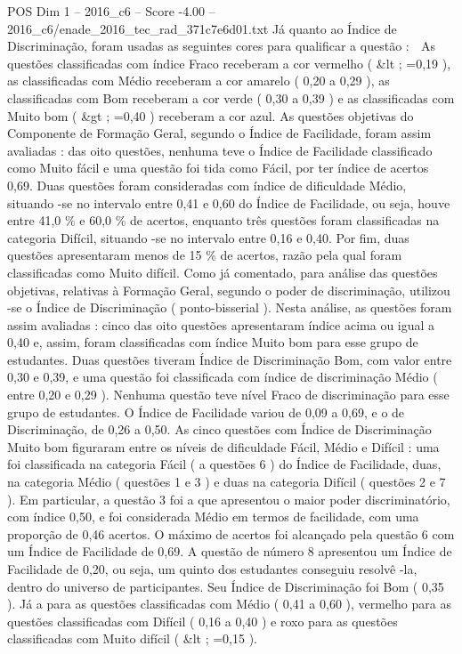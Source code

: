 \begin{textsample}{POS Dim 1 – 2016\_c6 – Score -4.00 – 2016\_c6/enade\_2016\_tec\_rad\_371c7e6d01.txt}
Já quanto ao Índice de Discriminação, foram usadas as seguintes cores para qualificar a questão :  As questões classificadas com índice Fraco receberam a cor vermelho ( \&lt ; =0,19 ), as classificadas com Médio receberam a cor amarelo ( 0,20 a 0,29 ), as classificadas com Bom receberam a cor verde ( 0,30 a 0,39 ) e as classificadas com Muito bom ( \&gt ; =0,40 ) receberam a cor azul.
As questões objetivas do Componente de Formação Geral, segundo o Índice de Facilidade, foram assim avaliadas : das oito questões, nenhuma teve o Índice de Facilidade classificado como Muito fácil e uma questão foi tida como Fácil, por ter índice de acertos 0,69.
Duas questões foram consideradas com índice de dificuldade Médio, situando -se no intervalo entre 0,41 e 0,60 do Índice de Facilidade, ou seja, houve entre 41,0 \% e 60,0 \% de acertos, enquanto três questões foram classificadas na categoria Difícil, situando -se no intervalo entre 0,16 e 0,40.
Por fim, duas questões apresentaram menos de 15 \% de acertos, razão pela qual foram classificadas como Muito difícil.
Como já comentado, para análise das questões objetivas, relativas à Formação Geral, segundo o poder de discriminação, utilizou -se o Índice de Discriminação ( ponto-bisserial ).
Nesta análise, as questões foram assim avaliadas : cinco das oito questões apresentaram índice acima ou igual a 0,40 e, assim, foram classificadas com índice Muito bom para esse grupo de estudantes.
Duas questões tiveram Índice de Discriminação Bom, com valor entre 0,30 e 0,39, e uma questão foi classificada com índice de discriminação Médio ( entre 0,20 e 0,29 ).
Nenhuma questão teve nível Fraco de discriminação para esse grupo de estudantes.
O Índice de Facilidade variou de 0,09 a 0,69, e o de Discriminação, de 0,26 a 0,50.
As cinco questões com Índice de Discriminação Muito bom figuraram entre os níveis de dificuldade Fácil, Médio e Difícil : uma foi classificada na categoria Fácil ( a questões 6 ) do Índice de Facilidade, duas, na categoria Médio ( questões 1 e 3 ) e duas na categoria Difícil ( questões 2 e 7 ).
Em particular, a questão 3 foi a que apresentou o maior poder discriminatório, com índice 0,50, e foi considerada Médio em termos de facilidade, com uma proporção de 0,46 acertos.
O máximo de acertos foi alcançado pela questão 6 com um Índice de Facilidade de 0,69.
A questão de número 8 apresentou um Índice de Facilidade de 0,20, ou seja, um quinto dos estudantes conseguiu resolvê -la, dentro do universo de participantes.
Seu Índice de Discriminação foi Bom ( 0,35 ).
Já a para as questões classificadas com Médio ( 0,41 a 0,60 ), vermelho para as questões classificadas com Difícil ( 0,16 a 0,40 ) e roxo para as questões classificadas com Muito difícil ( \&lt ; =0,15 ).

\end{textsample}
